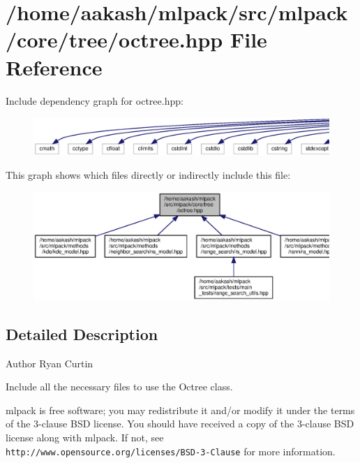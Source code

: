 \section{/home/aakash/mlpack/src/mlpack/core/tree/octree.hpp File Reference}
\label{octree_8hpp}
Include dependency graph for octree.\+hpp\+:
\nopagebreak
\begin{figure}[H]
\begin{center}
\leavevmode
\includegraphics[width=350pt]{octree_8hpp__incl}
\end{center}
\end{figure}
This graph shows which files directly or indirectly include this file\+:
\nopagebreak
\begin{figure}[H]
\begin{center}
\leavevmode
\includegraphics[width=350pt]{octree_8hpp__dep__incl}
\end{center}
\end{figure}


\subsection{Detailed Description}
\begin{DoxyAuthor}{Author}
Ryan Curtin
\end{DoxyAuthor}
Include all the necessary files to use the Octree class.

mlpack is free software; you may redistribute it and/or modify it under the terms of the 3-\/clause B\+SD license. You should have received a copy of the 3-\/clause B\+SD license along with mlpack. If not, see {\tt http\+://www.\+opensource.\+org/licenses/\+B\+S\+D-\/3-\/\+Clause} for more information. 